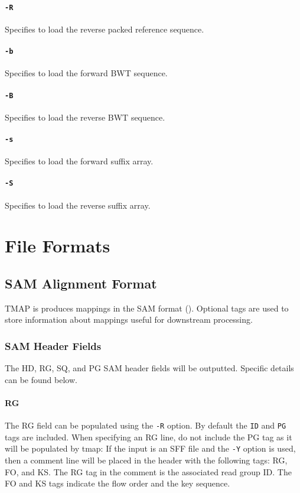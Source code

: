 \documentclass[a4paper,12pt]{book}
\newcommand{\TT}[1]{{\tt #1}} %
\begin{document}
\subsubsection{\TT{-R}}
Specifies to load the reverse packed reference sequence.

\subsubsection{\TT{-b}}
Specifies to load the forward BWT sequence.

\subsubsection{\TT{-B}}
Specifies to load the reverse BWT sequence.

\subsubsection{\TT{-s}}
Specifies to load the forward suffix array.

\subsubsection{\TT{-S}}
Specifies to load the reverse suffix array.


\chapter{File Formats}

\section{SAM Alignment Format}
TMAP is produces mappings in the SAM format (\cite{SAM-format}).
Optional tags are used to store information about mappings useful for downstream processing.

\subsection{SAM Header Fields}

The HD, RG, SQ, and PG SAM header fields will be outputted.
Specific details can be found below.

\subsubsection{RG}
The RG field can be populated using the \TT{-R} option.
By default the \TT{ID} and \TT{PG} tags are included.
When specifying an RG line, do not include the PG tag as it will be populated by tmap:
If the input is an SFF file and the \TT{-Y} option is used, then a comment line will be placed in the header with the following tags:
RG, FO, and KS.
The RG tag in the comment is the associated read group ID.
The FO and KS tags indicate the flow order and the key sequence.
\end{document}
